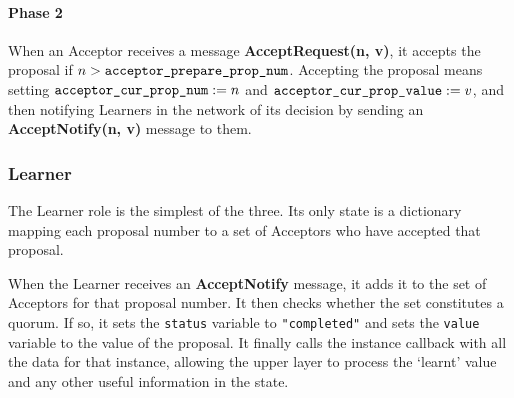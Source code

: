 \documentclass[12pt,twoside,notitlepage]{report}
\newcommand{\msg}[1] {{\bf #1}}         %
\begin{document}
\paragraph{Phase 2}

When an Acceptor receives a message \msg{AcceptRequest(n, v)}, it accepts the proposal if $n >
\verb|acceptor_prepare_prop_num|$. Accepting the proposal means setting $\verb|acceptor_cur_prop_num| := n$ and
$\verb|acceptor_cur_prop_value| := v$, and then notifying Learners in the network of its decision by
sending an \msg{AcceptNotify(n, v)} message to them.


\subsubsection{Learner}

The Learner role is the simplest of the three. Its only state is a dictionary mapping
each proposal number to a set of Acceptors who have accepted that proposal.

When the Learner receives an \msg{AcceptNotify} message, it adds it to the set of Acceptors for
that proposal number. It then checks whether the set constitutes a quorum. If so, it sets the
\verb+status+ variable to \verb+"completed"+ and sets the \verb+value+ variable to the value of
the proposal. It finally calls the instance callback with all the data for that instance, allowing
the upper layer to process the `learnt' value and any other useful information in the state.

\end{document}
